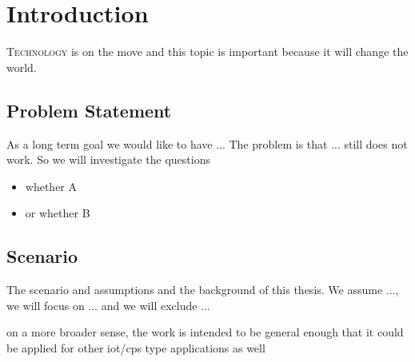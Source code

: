 \documentclass[%
    ]{\PathToTumTemplate/thesis/tum_thesis}
\begin{document}
\cleardoublepage
\mainmatter


\chapter{Introduction}
 
 
\lettrine{T}{echnology} is on the move and this topic is important because it will change the world.




\section{Problem Statement}\label{sec:probstat}
As a long term goal we would like to have ...
The problem is that ... still does not work. So we will investigate the questions
\begin{itemize}
    \item whether A
    \item or whether B
\end{itemize}



\section{Scenario}

The scenario and assumptions and the background of this thesis. We assume ..., we will focus on ... and we will exclude ...

on a more broader sense, the work is intended to be general enough that it could be applied for other iot/cps type applications as well
\end{document}
